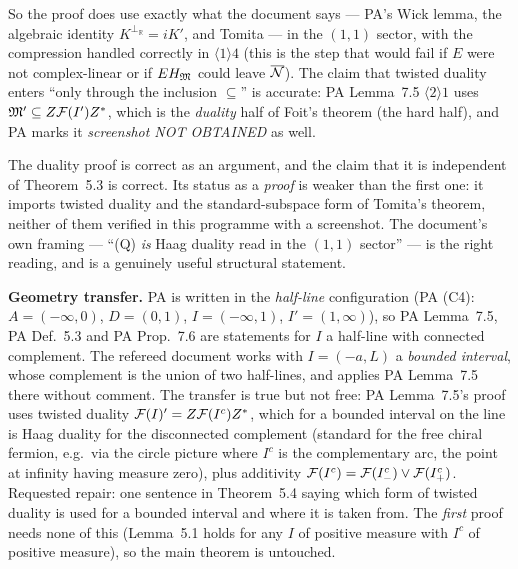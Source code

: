 \documentclass[11pt]{article}
\begin{document}
So the proof does use exactly what the document says --- PA's Wick lemma, the algebraic
identity $K^{\perp_{\mathbb R}}=iK'$, and Tomita --- in the $(1,1)$ sector, with the
compression handled correctly in $\langle1\rangle4$ (this is the step that would fail if $E$
were not complex-linear or if $EH_\mathfrak M$ could leave $\overline{\mathcal N}$).  The claim that
twisted duality enters ``only through the inclusion $\subseteq$'' is accurate: PA Lemma~7.5
$\langle2\rangle1$ uses $\mathfrak M'\subseteq Z\mathcal F(I')Z^*$, which is the \emph{duality} half of
Foit's theorem (the hard half), and PA marks it \emph{screenshot NOT OBTAINED} as well.

\begin{verdictok}
The duality proof is correct as an argument, and the claim that it is independent of
Theorem~5.3 is correct.  Its status as a \emph{proof} is weaker than the first one: it
imports twisted duality and the standard-subspace form of Tomita's theorem, neither of them
verified in this programme with a screenshot.  The document's own framing --- ``(Q) \emph{is}
Haag duality read in the $(1,1)$ sector'' --- is the right reading, and is a genuinely
useful structural statement.
\end{verdictok}

\begin{verdictgap}
\textbf{Geometry transfer.}  PA is written in the \emph{half-line} configuration
(PA (C4): $A=(-\infty,0)$, $D=(0,1)$, $I=(-\infty,1)$, $I'=(1,\infty)$), so PA Lemma~7.5,
PA Def.~5.3 and PA Prop.~7.6 are statements for $I$ a half-line with connected complement.
The refereed document works with $I=(-a,L)$ a \emph{bounded interval}, whose complement is
the union of two half-lines, and applies PA Lemma~7.5 there without comment.  The transfer is
true but not free: PA Lemma~7.5's proof uses twisted duality $\mathcal F(I)'=Z\mathcal F(I^c)Z^*$, which
for a bounded interval on the line is Haag duality for the disconnected complement (standard
for the free chiral fermion, e.g.\ via the circle picture where $I^c$ is the complementary
arc, the point at infinity having measure zero), plus additivity
$\mathcal F(I^c)=\mathcal F(I^c_-)\vee\mathcal F(I^c_+)$.  Requested repair: one sentence in Theorem~5.4 saying
which form of twisted duality is used for a bounded interval and where it is taken from.
The \emph{first} proof needs none of this (Lemma~5.1 holds for any $I$ of positive measure
with $I^c$ of positive measure), so the main theorem is untouched.
\end{verdictgap}
\end{document}
